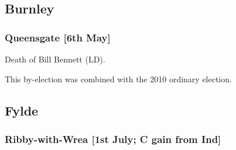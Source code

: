 \begin{resultsiii}
%
%
%
%

\subsection{Burnley}

\subsubsection*{Queensgate \hspace*{\fill}\nolinebreak[1]%
\enspace\hspace*{\fill}
[6th May]}


Death of Bill Bennett (LD).

This by-election was combined with the 2010 ordinary election.

\subsection{Fylde}

\subsubsection*{Ribby-with-Wrea \hspace*{\fill}\nolinebreak[1]%
\enspace\hspace*{\fill}
[1st July; C gain from Ind]}



\end{resultsiii}
